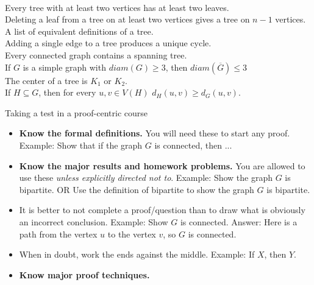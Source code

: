 \documentclass[12pt]{article}
\theoremstyle{homework}
\begin{document}
\\
Every tree with at least two vertices has at least two leaves.\\
Deleting a leaf from a tree on at least two vertices gives a tree on $n-1$ vertices.\\
A list of equivalent definitions of a tree.\\
Adding a single edge to a tree produces a unique cycle.\\
Every connected graph contains a spanning tree.\\
If $G$ is a simple graph with $diam(G) \geq 3$, then $diam(\overline{G}) \leq 3$\\
The center of a tree is $K_1$ or $K_2.$\\
If $H \subseteq G$, then for every $u,v \in V(H)$ $d_H(u,v) \geq d_G(u,v).$

\newpage

Taking a test in a proof-centric course

\begin{itemize}
\item \textbf{Know the formal definitions.} You will need these to start any proof. Example: Show that if the graph $G$ is connected, then ...
\item \textbf{Know the major results and homework problems.} You are allowed to use these \textit{unless explicitly directed not to}. Example: Show the graph $G$ is bipartite. OR Use the definition of bipartite to show the graph $G$ is bipartite. 
\item It is better to not complete a proof/question than to draw what is obviously an incorrect conclusion. Example: Show $G$ is connected. Answer: Here is a path from the vertex $u$ to the vertex $v$, so $G$ is connected.
\item When in doubt, work the ends against the middle. Example: If $X$, then $Y$.
\item \textbf{Know major proof techniques.}
\end{itemize}
\end{document}
